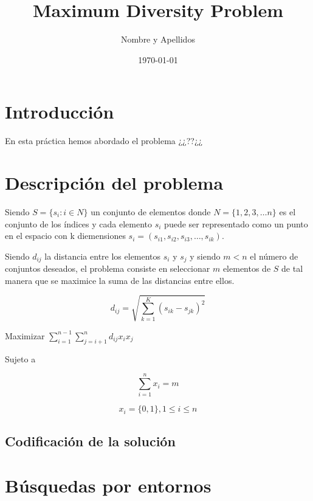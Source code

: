 \documentclass{article}
\title{Maximum Diversity Problem}
\author{Nombre y Apellidos}
\date{\today}
\begin{document}
\maketitle

\tableofcontents

\newpage

\section{Introducción}
En esta práctica hemos abordado el problema ¿¿??¿¿
\section{Descripción del problema}
Siendo  $S = \{s_i : i \in N\}$ un conjunto de elementos donde $N=\{1,2,3,…n\}$ es el conjunto de los índices y cada elemento $s_i$ puede ser representado como un punto en el espacio con k diemensiones $s_i = (s_{i1},s_{i2}, s_{i3}, … , s_{ik})$.

Siendo {$d_{ij}$} la distancia entre los elementos {$s_i$} y {$s_j$} y siendo $m < n$ el número de conjuntos deseados, el problema consiste en seleccionar $m$ elementos de $S$ de tal manera que se maximice la suma de las distancias entre ellos.

\vspace{10pt}

$$d_{ij} = \sqrt{\sum_{k=1}^{K}(s_{ik} - s_{jk})^2}$$

\vspace{10pt}

 Maximizar $\sum_{i=1}^{n-1}\sum_{j=i+1}^{n}d_{ij}x_{i}x_{j}$
											
\vspace{10pt}												
												
Sujeto a 

$$\sum_{i=1}^{n}x_{i}=m$$

\vspace{5pt}

$$x_{i} = \{0, 1\},	1 \leq i \leq n$$

\subsection{Codificación de la solución}
\section{Búsquedas por entornos}
\end{document}
